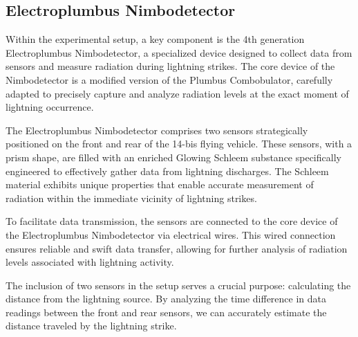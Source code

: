 \documentclass[english]{cenarticle}
\begin{document}
\subsection{Electroplumbus Nimbodetector}

Within the experimental setup, a key component is the 4th generation Electroplumbus Nimbodetector, a specialized device designed to collect data from sensors and measure radiation during lightning strikes. The core device of the Nimbodetector is a modified version of the Plumbus Combobulator, carefully adapted to precisely capture and analyze radiation levels at the exact moment of lightning occurrence.

The Electroplumbus Nimbodetector comprises two sensors strategically positioned on the front and rear of the 14-bis flying vehicle. These sensors, with a prism shape, are filled with an enriched Glowing Schleem substance specifically engineered to effectively gather data from lightning discharges. The Schleem material exhibits unique properties that enable accurate measurement of radiation within the immediate vicinity of lightning strikes.

To facilitate data transmission, the sensors are connected to the core device of the Electroplumbus Nimbodetector via electrical wires. This wired connection ensures reliable and swift data transfer, allowing for further analysis of radiation levels associated with lightning activity.

The inclusion of two sensors in the setup serves a crucial purpose: calculating the distance from the lightning source. By analyzing the time difference in data readings between the front and rear sensors, we can accurately estimate the distance traveled by the lightning strike.
\end{document}
